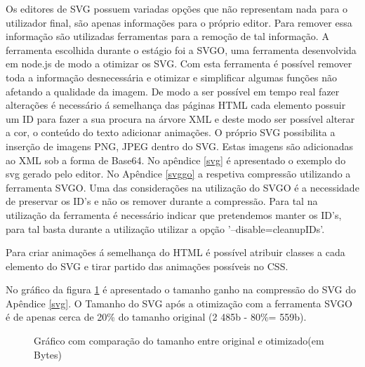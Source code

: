 \par Os editores de SVG possuem variadas opções que não representam nada para o utilizador final, são apenas informações para o próprio editor. Para remover essa informação são utilizadas ferramentas para a remoção de tal informação. A ferramenta escolhida durante o estágio foi a SVGO\cite{svgo}, uma ferramenta desenvolvida em node.js de modo a otimizar os SVG. Com esta ferramenta é possível remover toda a informação desnecessária e otimizar e simplificar algumas funções não afetando a qualidade da imagem. De modo a ser possível em tempo real fazer alterações é necessário á semelhança das páginas HTML cada elemento possuir um ID para fazer a sua procura na árvore XML e deste modo ser possível alterar a cor, o conteúdo do texto adicionar animações. O próprio SVG possibilita a inserção de imagens PNG, JPEG dentro do SVG. Estas imagens são adicionadas ao XML sob a forma de Base64. No apêndice \ref{svg} é apresentado o exemplo do svg gerado pelo editor. No Apêndice \ref{svggo} a respetiva compressão utilizando a ferramenta SVGO. Uma das considerações na utilização do SVGO é a necessidade de preservar os ID's e não os remover durante a compressão. Para tal na utilização da ferramenta é necessário indicar que  pretendemos manter os ID's, para tal basta durante a utilização utilizar a opção '--disable=cleanupIDs'.

\par Para criar animações á semelhança do HTML é possível atribuir classes a cada elemento do SVG e tirar partido das animações possíveis no CSS. 
\par No gráfico da figura \ref{compSV} é apresentado o tamanho ganho na compressão do SVG do Apêndice \ref{svg}. O Tamanho do SVG após a otimização com a ferramenta SVGO é de apenas cerca de 20\% do tamanho original (2 485b - 80\%= 559b).

\begin{figure}[ht]
\centering
{}

\caption{Gráfico com comparação do tamanho entre original e otimizado(em Bytes)}\label{compSV}


\end{figure}

